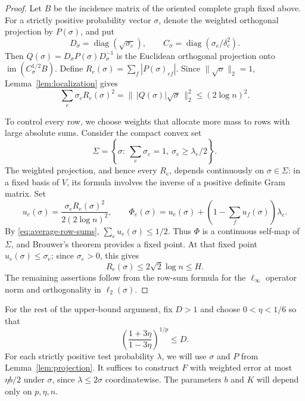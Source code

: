 \documentclass[11pt]{article}
\theoremstyle{remark}
\numberwithin{equation}{section}
\begin{document}
\begin{proof}
Let $B$ be the incidence matrix of the oriented complete graph fixed above.
For a strictly positive probability vector $\sigma$, denote the weighted
orthogonal projection by $P(\sigma)$, and put
\[
 D_\sigma=\operatorname{diag}(\sqrt{\sigma_e}),\qquad
 C_\sigma=\operatorname{diag}(\sigma_e/\delta_e^2).
\]
Then $Q(\sigma)=D_\sigma P(\sigma)D_\sigma^{-1}$ is the Euclidean
orthogonal projection onto $\operatorname{im}(C_\sigma^{1/2}B)$.
Define $R_e(\sigma)=\sum_f|P(\sigma)_{ef}|$. Since
$\|\sqrt\sigma\|_2=1$, Lemma~\ref{lem:localization} gives
\begin{equation}\label{eq:average-row-sums}
 \sum_e\sigma_e R_e(\sigma)^2
   =\bigl\|\,|Q(\sigma)|\sqrt\sigma\,\bigr\|_2^2
   \le (2\log n)^2.
\end{equation}

To control every row, we choose weights that allocate more mass to
rows with large absolute sums. Consider the compact convex set
\[
 \Sigma=\left\{\sigma:\ \sum_e\sigma_e=1,
                         \ \sigma_e\ge\lambda_e/2\right\}.
\]
The weighted projection, and hence every $R_e$, depends continuously on
$\sigma\in\Sigma$: in a fixed basis of $V$, its formula involves the
inverse of a positive definite Gram matrix. Set
\[
 u_e(\sigma)=\frac{\sigma_eR_e(\sigma)^2}{2(2\log n)^2},
 \qquad
 \Phi_e(\sigma)=u_e(\sigma)
       +\left(1-\sum_f u_f(\sigma)\right)\lambda_e.
\]
By \eqref{eq:average-row-sums}, $\sum_eu_e(\sigma)\le1/2$.
Thus $\Phi$ is a continuous self-map of $\Sigma$, and Brouwer's theorem
\cite[Corollary~2.15]{Hatcher2002} provides a fixed point.
At that fixed point $u_e(\sigma)\le\sigma_e$;
since $\sigma_e>0$, this gives
\[
 R_e(\sigma)\le2\sqrt2\log n\le H.
\]
The remaining assertions follow from the row-sum formula for the
$\ell_\infty$ operator norm and orthogonality in $\ell_2(\sigma)$.
\end{proof}

For the rest of the upper-bound argument, fix $D>1$ and choose
$0<\eta<1/6$ so that
\begin{equation}\label{eq:eta-choice}
 \left(\frac{1+3\eta}{1-3\eta}\right)^{1/p}\le D.
\end{equation}
For each strictly positive test probability $\lambda$, we will use
$\sigma$ and $P$ from Lemma~\ref{lem:projection}. It suffices to
construct $F$ with weighted error at most $\eta b/2$ under $\sigma$,
since $\lambda\le2\sigma$ coordinatewise. The parameters $b$ and $K$
will depend only on $p,\eta,n$.
\end{document}
